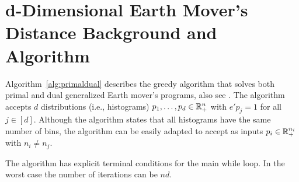\section{d-Dimensional Earth Mover's Distance Background and Algorithm}\label{sec:suppdemd}
Algorithm~\ref{alg:primaldual} describes the greedy algorithm that solves both primal and dual generalized Earth mover's programs, also see \citep{kline2019properties}. The algorithm accepts $d$ distributions (i.e., histograms) $p_1,\ldots,p_d\in\mathbb{R}^{n}_+$ with $e'p_j=1$ for all $j\in[d]$. 
Although the algorithm states that all histograms have the same number of bins, the algorithm can be 
easily adapted to accept as inputs $p_i\in\mathbb{R}^{n_i}_+$ with $n_i\not=n_j$.
\iffalse
\begin{algorithm}
\caption{EMD Primal/Dual Algorithm}\label{alg:primaldual}
\begin{algorithmic}
\State {\bf input} $p_j\in\RR^{n}_+$ with $e'p_j=1$ , $(\forall j\in[d])$
\State {\em //iteration index, active indices, primal variables, dual variables}
\State  $k \coloneqq 0\in\ZZ$, $I \coloneqq 0\in\ZZ^{d}$, $x \coloneqq 0\in\RR^{n^{d}}$, $z_j\coloneqq 0\in\RR^{n}$, $(\forall j\in [d])$
\While{$I(j) \leq n$, $(\forall j\in[d])$}
    \State $s_k\coloneqq \min_{j\in[d]} p_j(I(j))$ {\em\hspace*{\fill}  // the mass to move}
    \State $x(I)\gets s_k$  {\em \hspace*{\fill} // update the EMD solution}
    \State $p_j(I(j))\gets p_j(I(j))-s_k$, $(\forall j\in d)${\em\hspace*{\fill} // shrink the data}
    \State $j^*\gets\arg\min_{j\in[d]} p_j(I(j))$
    \State  $I(j^*)\gets I(j^*)+1$
    \State $k\gets k+1$
    \State $t_k\gets c(I)${\em\hspace*{\fill} // cost of this step}
    \If{ $I(j^*)\leq n$}
        \State  $z_{j^*}(I(j^*))\gets t_k-t_{k-1} + z_{j^*}(I(j^*)-1)$ {\em\hspace*{\fill} // update the dual solution}
    \EndIf
\EndWhile
\State \Return $x$, $(z_1,\ldots,z_d)$, and the objective value $\sum_k s_k t_k$.
\end{algorithmic}
\end{algorithm}
\fi
The algorithm has explicit terminal conditions for the main while loop. In the worst case the number of iterations can be $nd$.